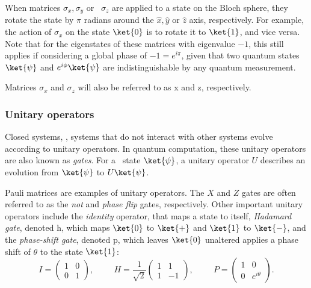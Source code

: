 When matrices $\sigma_x, \sigma_y$ or  $\sigma_z$ are applied to a state on the Bloch sphere, they rotate the state by $\pi$ radians around the $\hat{x}, \hat{y}$ or $\hat{z}$ axis, respectively. For example, the action of $\sigma_x$ on the state $\ket{0}$ is to rotate it to $\ket{1}$, and vice versa. Note that for the eigenstates of these matrices with eigenvalue $-1$, this still applies if considering a global phase of $-1 = e^{i\pi}$, given that two quantum states $\ket{\psi}$ and $e^{i\phi}\ket{\psi}$ are indistinguishable by any quantum measurement.

Matrices $\sigma_x$ and $\sigma_z$ will also be referred to as \gls{x} and \gls{z}, respectively.

\subsubsection{Unitary operators}
Closed systems, , systems that do not interact with other systems evolve according to unitary operators. In quantum computation, these unitary operators are also known as \emph{gates}. For a  state $\ket{\psi}$, a unitary operator $U$ describes an evolution from $\ket{\psi}$ to $ U\ket{\psi}$.

Pauli matrices are examples of unitary operators. The $X$ and $Z$ gates are often referred to as the \emph{not} and \emph{phase flip} gates, respectively. Other important unitary operators include the \emph{identity} operator, that maps a state to itself,  \emph{Hadamard gate}, denoted \gls{h}, which maps $\ket{0}$ to $\ket{+}$ and $\ket{1}$ to  $\ket{-}$, and the \emph{phase-shift gate}, denoted \gls{p}, which leaves $\ket{0}$ unaltered applies a phase shift of $\theta$ to the state $\ket{1}$:
\begin{equation*}
  I = \begin{pmatrix} 1 & 0\\ 0 & 1 \end{pmatrix}, \hspace{1cm} H = \frac{1}{\sqrt{2}}\begin{pmatrix} 1 & 1\\ 1 & -1 \end{pmatrix}, \hspace{1cm} P = \begin{pmatrix} 1 & 0\\ 0 & e^{i \theta} \end{pmatrix}.
\end{equation*}
 
